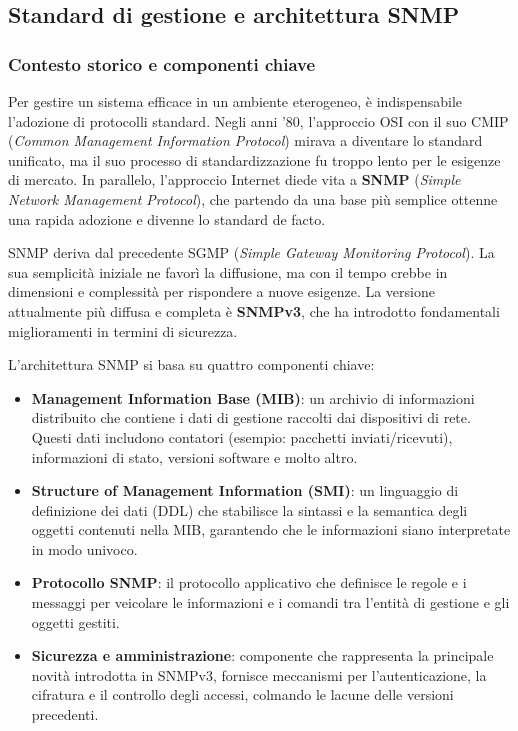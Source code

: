 \subsection{Standard di gestione e architettura SNMP}

\subsubsection{Contesto storico e componenti chiave}

Per gestire un sistema efficace in un ambiente eterogeneo, è indispensabile
l'adozione di protocolli standard. Negli anni '80, l'approccio OSI con il suo
CMIP (\textit{Common Management Information Protocol}) mirava a diventare lo
standard unificato, ma il suo processo di standardizzazione fu troppo lento per
le esigenze di mercato. In parallelo, l'approccio Internet diede vita a
\textbf{SNMP} (\textit{Simple Network Management Protocol}), che partendo da
una base più semplice ottenne una rapida adozione e divenne lo standard de facto.

SNMP deriva dal precedente SGMP (\textit{Simple Gateway Monitoring Protocol}).
La sua semplicità iniziale ne favorì la diffusione, ma con il tempo crebbe in
dimensioni e complessità per rispondere a nuove esigenze. La versione attualmente
più diffusa e completa è \textbf{SNMPv3}, che ha introdotto fondamentali
miglioramenti in termini di sicurezza.

L'architettura SNMP si basa su quattro componenti chiave:

\begin{itemize}
\item \textbf{Management Information Base (MIB)}: un archivio di informazioni
distribuito che contiene i dati di gestione raccolti dai dispositivi di rete.
Questi dati includono contatori (esempio: pacchetti inviati/ricevuti),
informazioni di stato, versioni software e molto altro.
\item \textbf{Structure of Management Information (SMI)}: un linguaggio di
definizione dei dati (DDL) che stabilisce la sintassi e la semantica degli
oggetti contenuti nella MIB, garantendo che le informazioni siano interpretate
in modo univoco.
\item \textbf{Protocollo SNMP}: il protocollo applicativo che definisce le
regole e i messaggi per veicolare le informazioni e i comandi tra l'entità di
gestione e gli oggetti gestiti.
\item \textbf{Sicurezza e amministrazione}: componente che rappresenta la
principale novità introdotta in SNMPv3, fornisce meccanismi per
l'autenticazione, la cifratura e il controllo degli accessi, colmando le lacune
delle versioni precedenti.
\end{itemize}

